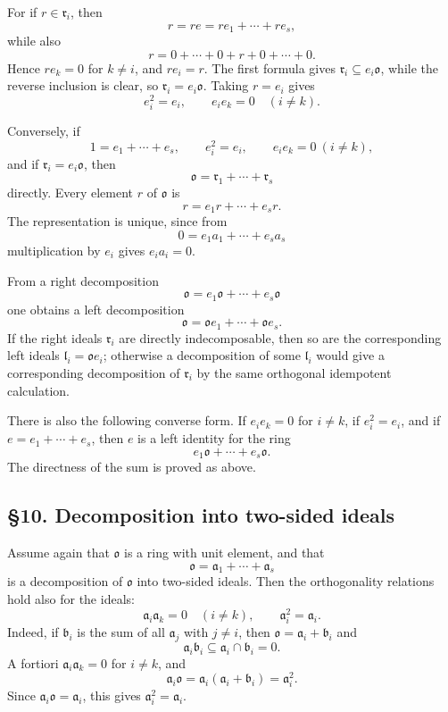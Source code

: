 \documentclass[
  11pt,
]{article}
\begin{document}
For if \(r\in\mathfrak r_i\), then \[
  r=re=r e_1+\cdots+r e_s,
\] while also \[
  r=0+\cdots+0+r+0+\cdots+0.
\] Hence \(re_k=0\) for \(k\ne i\), and \(re_i=r\). The first formula
gives \(\mathfrak r_i\subseteq e_i\mathfrak{o}\), while the reverse
inclusion is clear, so \(\mathfrak r_i=e_i\mathfrak{o}\). Taking
\(r=e_i\) gives \[
  e_i^2=e_i,
  \qquad e_i e_k=0\quad(i\ne k).
\]

Conversely, if \[
  1=e_1+\cdots+e_s,
  \qquad e_i^2=e_i,
  \qquad e_i e_k=0\ (i\ne k),
\] and if \(\mathfrak r_i=e_i\mathfrak{o}\), then \[
  \mathfrak{o}=\mathfrak r_1+\cdots+\mathfrak r_s
\] directly. Every element \(r\) of \(\mathfrak{o}\) is \[
  r=e_1r+\cdots+e_sr.
\] The representation is unique, since from \[
  0=e_1a_1+\cdots+e_sa_s
\] multiplication by \(e_i\) gives \(e_i a_i=0\).

From a right decomposition \[
  \mathfrak{o}=e_1\mathfrak{o}+\cdots+e_s\mathfrak{o}
\] one obtains a left decomposition \[
  \mathfrak{o}=\mathfrak{o}e_1+\cdots+\mathfrak{o}e_s.
\] If the right ideals \(\mathfrak r_i\) are directly indecomposable,
then so are the corresponding left ideals
\(\mathfrak l_i=\mathfrak{o}e_i\); otherwise a decomposition of some
\(\mathfrak l_i\) would give a corresponding decomposition of
\(\mathfrak r_i\) by the same orthogonal idempotent calculation.

There is also the following converse form. If \(e_i e_k=0\) for
\(i\ne k\), if \(e_i^2=e_i\), and if \(e=e_1+\cdots+e_s\), then \(e\) is
a left identity for the ring \[
  e_1\mathfrak{o}+\cdots+e_s\mathfrak{o}.
\] The directness of the sum is proved as above.

\subsection{§10. Decomposition into two-sided
ideals}\label{decomposition-into-two-sided-ideals}

Assume again that \(\mathfrak{o}\) is a ring with unit element, and that
\[
  \mathfrak{o}=\mathfrak a_1+\cdots+\mathfrak a_s
\] is a decomposition of \(\mathfrak{o}\) into two-sided ideals. Then
the orthogonality relations hold also for the ideals: \[
  \mathfrak a_i\mathfrak a_k=0\quad(i\ne k),
  \qquad
  \mathfrak a_i^2=\mathfrak a_i.
\] Indeed, if \(\mathfrak b_i\) is the sum of all \(\mathfrak a_j\) with
\(j\ne i\), then \(\mathfrak{o}=\mathfrak a_i+\mathfrak b_i\) and \[
  \mathfrak a_i\mathfrak b_i\subseteq\mathfrak a_i\cap\mathfrak b_i=0.
\] A fortiori \(\mathfrak a_i\mathfrak a_k=0\) for \(i\ne k\), and \[
  \mathfrak a_i\mathfrak{o}=\mathfrak a_i(\mathfrak a_i+\mathfrak b_i)=\mathfrak a_i^2.
\] Since \(\mathfrak a_i\mathfrak{o}=\mathfrak a_i\), this gives
\(\mathfrak a_i^2=\mathfrak a_i\).
\end{document}
